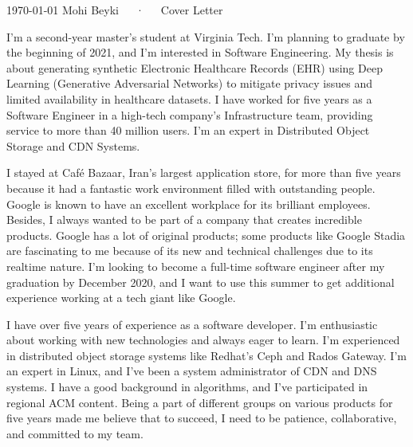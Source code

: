 \documentclass[11pt, a4paper]{awesome-cv}
\begin{document}
\makecvheader[R]

\makecvfooter
  {\today}
  {Mohi Beyki~~~·~~~Cover Letter}
  {}

\makelettertitle

\begin{cvletter}


I'm a second-year master's student at Virginia Tech. I'm planning to graduate by the beginning of 2021, and I'm interested in Software Engineering. My thesis is about generating synthetic Electronic Healthcare Records (EHR) using Deep Learning (Generative Adversarial Networks) to mitigate privacy issues and limited availability in healthcare datasets. I have worked for five years as a Software Engineer in a high-tech company's Infrastructure team, providing service to more than 40 million users. I'm an expert in Distributed Object Storage and CDN Systems.


I stayed at Café Bazaar, Iran's largest application store, for more than five years because it had a fantastic work environment filled with outstanding people. Google is known to have an excellent workplace for its brilliant employees. Besides, I always wanted to be part of a company that creates incredible products. Google has a lot of original products; some products like Google Stadia are fascinating to me because of its new and technical challenges due to its realtime nature. I'm looking to become a full-time software engineer after my graduation by December 2020, and I want to use this summer to get additional experience working at a tech giant like Google.


I have over five years of experience as a software developer. I'm enthusiastic about working with new technologies and always eager to learn. I'm experienced in distributed object storage systems like Redhat's Ceph and Rados Gateway. I'm an expert in Linux, and I've been a system administrator of CDN and DNS systems. I have a good background in algorithms, and I've participated in regional ACM content. Being a part of different groups on various products for five years made me believe that to succeed, I need to be patience, collaborative, and committed to my team.

\end{cvletter}


\makeletterclosing
\end{document}
